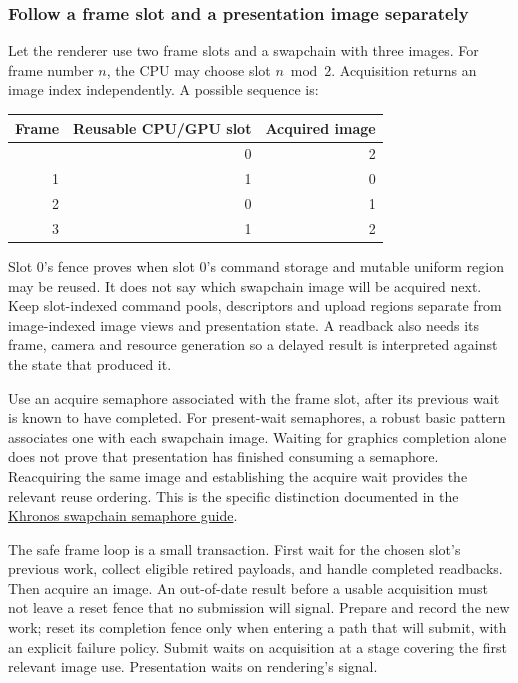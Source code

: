 \subsubsection{Follow a frame slot and a presentation image separately}\label{05-engine-i-ch019-follow-a-frame-slot-and-a-presentation-image-separately}

\hypertarget{05-engine-i-ch019-follow-a-frame-slot-and-a-presentation-image-separately}{}

Let the renderer use two frame slots and a swapchain with three images. For frame number \(n\), the CPU may choose slot \(n\bmod2\). Acquisition returns an image index independently. A possible sequence is:

{\def\LTcaptype{none} %
\begin{longtable}[]{@{}rrr@{}}
\toprule\noalign{}
Frame & Reusable CPU/GPU slot & Acquired image \\
\midrule\noalign{}
\endhead
\bottomrule\noalign{}
\endlastfoot
0 & 0 & 2 \\
1 & 1 & 0 \\
2 & 0 & 1 \\
3 & 1 & 2 \\
\end{longtable}
}

Slot 0's fence proves when slot 0's command storage and mutable uniform region may be reused. It does not say which swapchain image will be acquired next. Keep slot-indexed command pools, descriptors and upload regions separate from image-indexed image views and presentation state. A readback also needs its frame, camera and resource generation so a delayed result is interpreted against the state that produced it.

Use an acquire semaphore associated with the frame slot, after its previous wait is known to have completed. For present-wait semaphores, a robust basic pattern associates one with each swapchain image. Waiting for graphics completion alone does not prove that presentation has finished consuming a semaphore. Reacquiring the same image and establishing the acquire wait provides the relevant reuse ordering. This is the specific distinction documented in the \href{https://docs.vulkan.org/guide/latest/swapchain_semaphore_reuse.html}{Khronos swapchain semaphore guide}.

The safe frame loop is a small transaction. First wait for the chosen slot's previous work, collect eligible retired payloads, and handle completed readbacks. Then acquire an image. An out-of-date result before a usable acquisition must not leave a reset fence that no submission will signal. Prepare and record the new work; reset its completion fence only when entering a path that will submit, with an explicit failure policy. Submit waits on acquisition at a stage covering the first relevant image use. Presentation waits on rendering's signal.

